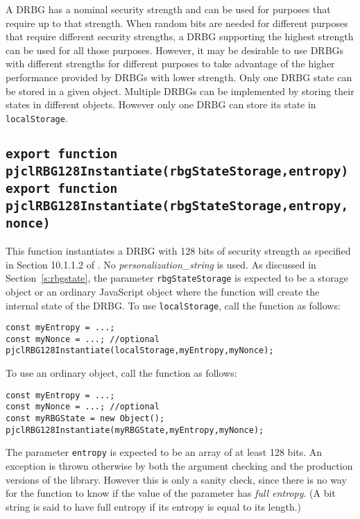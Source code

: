\documentclass[12pt]{article}
\begin{document}
A DRBG has a nominal security strength and can be used for purposes that
require up to that strength.  When random bits are needed for different 
purposes that require different security strengths, a DRBG supporting the
highest strength can be used for all those purposes.  However, it may be desirable to 
use DRBGs with different strengths for different purposes to take advantage
of the higher performance provided by DRBGs with lower strength.
Only one DRBG state can be stored in a given object.  Multiple DRBGs
can be implemented by storing their states in different objects.  However
only one DRBG can store its state in {\tt localStorage}.

\subsection{\tt export function pjclRBG128Instantiate(rbgStateStorage,entropy)\\export function pjclRBG128Instantiate(rbgStateStorage,entropy,nonce)}
\label{s:entropy}

This function instantiates a DRBG with 128 bits of security strength as specified in
Section 10.1.1.2 of \cite{SP800-90Ar1}.  No {\em personalization\_string\/} is used.
As discussed in Section~\ref{s:rbgstate}, the parameter {\tt rbgStateStorage} 
is expected to be a storage object or an ordinary JavaScript object where the 
function will create the internal state of the DRBG.
To use {\tt localStorage}, call the function as follows:
\begin{verbatim}
const myEntropy = ...;
const myNonce = ...; //optional
pjclRBG128Instantiate(localStorage,myEntropy,myNonce);
\end{verbatim}
To use an ordinary object, call the function as follows:
\begin{verbatim}
const myEntropy = ...;
const myNonce = ...; //optional
const myRBGState = new Object();
pjclRBG128Instantiate(myRBGState,myEntropy,myNonce);
\end{verbatim}

The parameter {\tt entropy} is expected to be an array of at least 128
bits.  An exception is thrown
otherwise by both the argument checking and the production versions of
the library.  However this is only a sanity check, since there is no
way for the function to know if the value of the parameter has {\em
  full entropy}.  (A bit string is said to have full entropy if its
entropy is equal to its length.)
\end{document}
